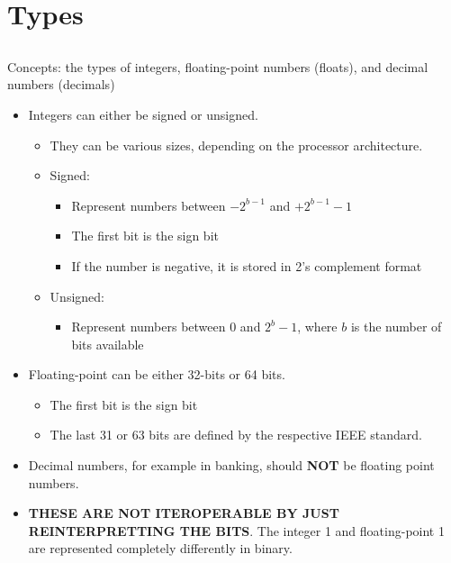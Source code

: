 \section{Types}\label{sec:Types}
\subsection{}
Concepts: the types of integers, floating-point numbers (floats), and decimal numbers (decimals)

\begin{itemize}
\item Integers can either be signed or unsigned.
  \begin{itemize}[noitemsep]
  \item They can be various sizes, depending on the processor architecture.
  \item Signed:
    \begin{itemize}[noitemsep]
    \item Represent numbers between $-2^{b-1}$ and $+2^{b-1}-1$
    \item The first bit is the sign bit
    \item If the number is negative, it is stored in 2's complement format
    \end{itemize}
  \item Unsigned:
    \begin{itemize}[noitemsep]
    \item Represent numbers between $0$ and $2^{b}-1$, where $b$ is the number of bits available
    \end{itemize}
  \end{itemize}

\item Floating-point can be either 32-bits or 64 bits.
  \begin{itemize}[noitemsep]
  \item The first bit is the sign bit
  \item The last 31 or 63 bits are defined by the respective IEEE standard.
  \end{itemize}

\item Decimal numbers, for example in banking, should \textbf{NOT} be floating point numbers.
\item \textbf{THESE ARE NOT ITEROPERABLE BY JUST REINTERPRETTING THE BITS}. The integer 1 and floating-point 1 are represented completely differently in binary.
\end{itemize}

